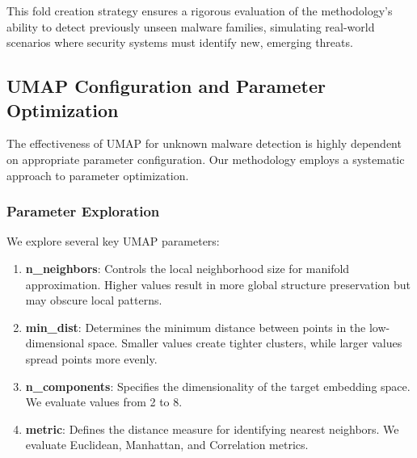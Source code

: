 This fold creation strategy ensures a rigorous evaluation of the methodology's ability to detect previously unseen malware families, simulating real-world scenarios where security systems must identify new, emerging threats.

\subsection{UMAP Configuration and Parameter Optimization}
\label{subsec:umap-config}

The effectiveness of UMAP for unknown malware detection is highly dependent on appropriate parameter configuration. Our methodology employs a systematic approach to parameter optimization.

\subsubsection{Parameter Exploration}

We explore several key UMAP parameters:

\begin{enumerate}
    \item \textbf{n\_neighbors}: Controls the local neighborhood size for manifold approximation. Higher values result in more global structure preservation but may obscure local patterns.
    
    \item \textbf{min\_dist}: Determines the minimum distance between points in the low-dimensional space. Smaller values create tighter clusters, while larger values spread points more evenly.
    
    \item \textbf{n\_components}: Specifies the dimensionality of the target embedding space. We evaluate values from 2 to 8.
    
    \item \textbf{metric}: Defines the distance measure for identifying nearest neighbors. We evaluate Euclidean, Manhattan, and Correlation metrics.
\end{enumerate}

